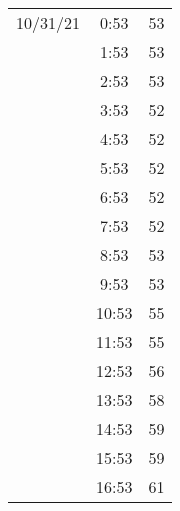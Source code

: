 \documentclass[nooutcomes]{ximera}
\begin{document}
\begin{tabular}{|c|c|c|}
10/31/21   &  0:53  &  53 \\
             &  1:53  &  53 \\
             &  2:53  &  53 \\
             &  3:53  &  52 \\
             &  4:53  &  52 \\
             &  5:53  &  52 \\
             &  6:53  &  52 \\
             &  7:53  &  52 \\
             &  8:53  &  53 \\
             &  9:53  &  53 \\
             &  10:53  &  55 \\
             &  11:53  &  55 \\
             &  12:53  &  56 \\
             &  13:53  &  58 \\
             &  14:53  &  59 \\
             &  15:53  &  59 \\
             &  16:53  &  61 \\

\end{tabular}
\end{document}
